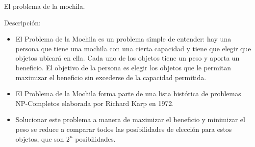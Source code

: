 \begin{frame}{El problema de la mochila.}
  
Descripción:

    \begin{itemize}[<+->]
        \item El Problema de la Mochila es un problema simple de entender: hay una persona que tiene
          una mochila con una cierta capacidad y tiene que elegir que objetos ubicará en ella. Cada
          uno de los objetos tiene un peso y aporta un beneficio. El objetivo de la persona es elegir
          los objetos que le permitan maximizar el beneficio sin excederse de la capacidad
          permitida.
        \item El Problema de la Mochila forma parte de una lista histórica de problemas NP-Completos
          elaborada por Richard Karp en 1972.
        \item Solucionar este problema a manera de maximizar el beneficio y minimizar el peso se reduce
          a comparar todos las posibilidades de elección para estos objetos, que son $2^n$ posibilidades.
    \end{itemize}
\end{frame}
